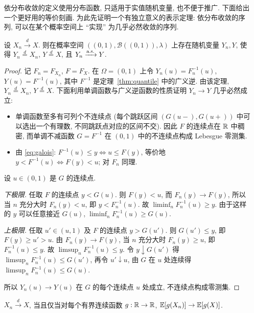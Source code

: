依分布收敛的定义使用分布函数, 只适用于实值随机变量, 也不便于推广. 下面给出一个更好用的等价刻画. 为此先证明一个有独立意义的表示定理: 依分布收敛的序列, 可以在某个概率空间上 ``实现'' 为几乎必然收敛的序列.

\begin{theorem}\label{thm:skorokhod}
设 $X_n\xrightarrow{d}X$. 则在概率空间 $((0,1),\mathcal{B}((0,1)),\lambda)$ 上存在随机变量 $Y_n,Y$, 使得 $Y_n\overset{d}{=}X_n$, $Y\overset{d}{=}X$, 且 $Y_n\xrightarrow{\text{a.s.}}Y$.
\end{theorem}

\begin{proof}
记 $F_n=F_{X_n}$, $F=F_X$. 在 $\Omega=(0,1)$ 上令 $Y_n(u)=F_n^{-1}(u)$, $Y(u)=F^{-1}(u)$, 其中 $F^{-1}$ 是定理~\ref{thm:quantile} 中的广义逆. 由该定理, $Y_n\overset{d}{=}X_n$, $Y\overset{d}{=}X$. 下面利用单调函数与广义逆函数的性质证明 $Y_n\to Y$ 几乎必然成立:
\begin{itemize}
\item 单调函数至多有可列个不连续点 (每个跳跃区间 $(G(u-),G(u+))$ 中可以选出一个有理数, 不同跳跃点对应的区间不交). 因此 $F$ 的连续点在 $\mathbb{R}$ 中稠密, 而单调不减函数 $G=F^{-1}$ 在 $(0,1)$ 中的不连续点构成 Lebesgue 零测集.
\item 由 \eqref{eq:galois}: $F^{-1}(u)\le y\iff u\le F(y)$, 等价地 $y<F^{-1}(u)\iff F(y)<u$; 对 $F_n$ 同理.
\end{itemize}
设 $u\in(0,1)$ 是 $G$ 的连续点.

\emph{下极限.} 任取 $F$ 的连续点 $y<G(u)$. 则 $F(y)<u$, 而 $F_n(y)\to F(y)$, 所以当 $n$ 充分大时 $F_n(y)<u$, 即 $y<F_n^{-1}(u)$. 故 $\liminf_n F_n^{-1}(u)\ge y$. 由于这样的 $y$ 可以任意接近 $G(u)$, $\liminf_n F_n^{-1}(u)\ge G(u)$.

\emph{上极限.} 任取 $u'\in(u,1)$ 及 $F$ 的连续点 $y>G(u')$. 则 $G(u')\le y$, 即 $F(y)\ge u'>u$. 由 $F_n(y)\to F(y)$, 当 $n$ 充分大时 $F_n(y)\ge u$, 即 $F_n^{-1}(u)\le y$. 故 $\limsup_n F_n^{-1}(u)\le y$. 令 $y\downarrow G(u')$ 得 $\limsup_n F_n^{-1}(u)\le G(u')$, 再令 $u'\downarrow u$, 由 $G$ 在 $u$ 处连续得 $\limsup_n F_n^{-1}(u)\le G(u)$.

所以 $Y_n(u)\to Y(u)$ 在 $G$ 的每个连续点 $u$ 处成立, 不连续点构成零测集.
\end{proof}

\begin{theorem}[依分布收敛的等价刻画]\label{thm:portmanteau}
$X_n\xrightarrow{d}X$, 当且仅当对每个有界连续函数 $g:\mathbb{R}\to\mathbb{R}$, $\mathbb{E}[g(X_n)]\to\mathbb{E}[g(X)]$.
\end{theorem}

